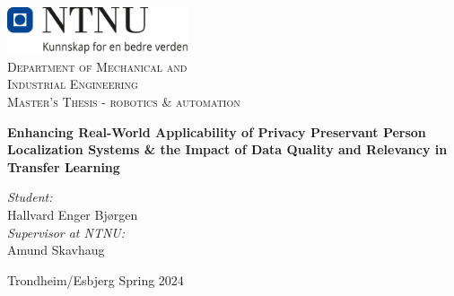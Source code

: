 \begin{titlepage}
\vbox{ }
\vbox{ }
\begin{center}
{\includegraphics[width=0.40\textwidth]{Images/NTNU_logo.png}}\\[1cm]
\textsc{\LARGE Department of Mechanical and  }\\[0.3cm]
\textsc{\LARGE Industrial Engineering}\\[1.5cm]
\textsc{\Large Master's Thesis - robotics \& automation}\\[0.5cm]
\vbox{ }

{ \huge \bfseries Enhancing Real-World Applicability of Privacy Preservant Person Localization Systems \& the Impact of Data Quality and Relevancy in Transfer Learning}
\\[3cm]



\large


\emph{Student:}\\
Hallvard Enger Bjørgen\\
\vspace{1cm}
\emph{Supervisor at NTNU:}\\
Amund Skavhaug
\vfill

{\large Trondheim/Esbjerg Spring 2024}
\end{center}
\end{titlepage}